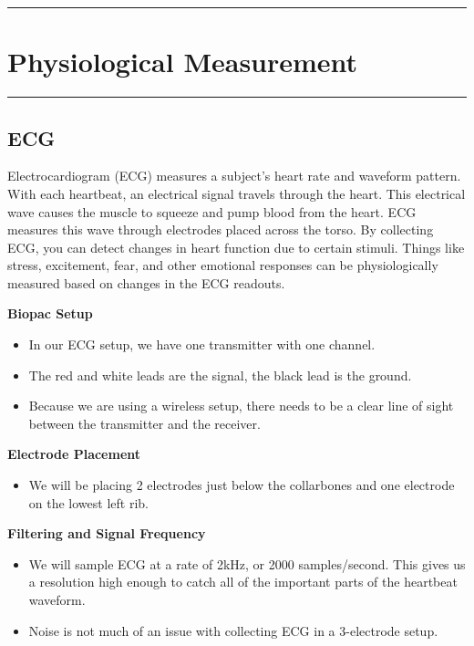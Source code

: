 \documentclass[]{book}
\providecommand{\tightlist}{%
  \setlength{\itemsep}{0pt}\setlength{\parskip}{0pt}}
\begin{document}
\begin{center}\rule{0.5\linewidth}{\linethickness}\end{center}

\hypertarget{physiological-measurement}{%
\section{Physiological Measurement}\label{physiological-measurement}}

\begin{center}\rule{0.5\linewidth}{\linethickness}\end{center}

\hypertarget{ecg}{%
\subsection{ECG}\label{ecg}}

Electrocardiogram (ECG) measures a subject's heart rate and waveform pattern. With each heartbeat, an electrical signal travels through the heart. This electrical wave causes the muscle to squeeze and pump blood from the heart. ECG measures this wave through electrodes placed across the torso. By collecting ECG, you can detect changes in heart function due to certain stimuli. Things like stress, excitement, fear, and other emotional responses can be physiologically measured based on changes in the ECG readouts.

\textbf{Biopac Setup}

\begin{itemize}
\tightlist
\item
  In our ECG setup, we have one transmitter with one channel.
\item
  The red and white leads are the signal, the black lead is the ground.
\item
  Because we are using a wireless setup, there needs to be a clear line of sight between the transmitter and the receiver.
\end{itemize}

\textbf{Electrode Placement}

\begin{itemize}
\tightlist
\item
  We will be placing 2 electrodes just below the collarbones and one electrode on the lowest left rib.
\end{itemize}

\textbf{Filtering and Signal Frequency}

\begin{itemize}
\tightlist
\item
  We will sample ECG at a rate of 2kHz, or 2000 samples/second. This gives us a resolution high enough to catch all of the important parts of the heartbeat waveform.
\item
  Noise is not much of an issue with collecting ECG in a 3-electrode setup.
\end{itemize}
\end{document}
